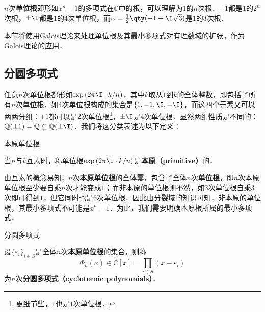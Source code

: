 



$n$次\textbf{单位根}即形如$x^n-1$的多项式在$\mathbb{C}$中的根，可以理解为$1$的$n$次根．$\pm 1$都是$1$的$2^n$次根，$\pm \I$都是$1$的$4$次单位根，而$\omega=\frac{1}{2}\qty(-1+\I\sqrt{3})$是$1$的$3$次根．

本节将使用Galois理论来处理单位根及其最小多项式对有理数域的扩张，作为Galois理论的应用．


\subsection{分圆多项式}

任意$n$次单位根都形如$\exp{(2\pi\I\cdot  k/n)}$，其中$k$取从$1$到$k$的全体整数，即包括了所有$n$次单位根．如$4$次单位根构成的集合是$\{1, -1, \I, -\I\}$，而这四个元素又可以两两分组：$\pm 1$都可以是$2$次单位根\footnote{更细节些，$1$也是$1$次单位根．}，$\pm \I$是$4$次单位根．显然两组性质是不同的：$\mathbb{Q}(\pm 1)=\mathbb{Q}\subsetneq \mathbb{Q}(\pm\I)$．我们将这分类表述为以下定义：

\begin{definition}{本原单位根}

当$n$与$k$互素时，称单位根$\exp{(2\pi\I\cdot  k/n)}$是\textbf{本原（primitive）}的．

\end{definition}

由互素的概念易知，$n$次\textbf{本原单位根}的全体幂，包含了全体$n$次\textbf{单位根}，即$n$次本原单位根至少要自乘$n$次才能变成$1$；而非本原的单位根则不然，如$3$次单位根自乘$3$次即可得到$1$，但它同时也是$6$次单位根．因此由分裂域的知识可知，非本原的单位根，其最小多项式不可能是$x^n-1$．为此，我们需要明确本原根所属的最小多项式．

\begin{definition}{分圆多项式}

设$\{\varepsilon_i\}_{i\in S}$是全体$n$次\textbf{本原单位根}的集合，则称
\begin{equation}
\Phi_n(x)\in \mathbb{C}[x] = \prod_{i\in S}(x-\varepsilon_i)
\end{equation}
为$n$次\textbf{分圆多项式（cyclotomic polynomials）}．

\end{definition}




